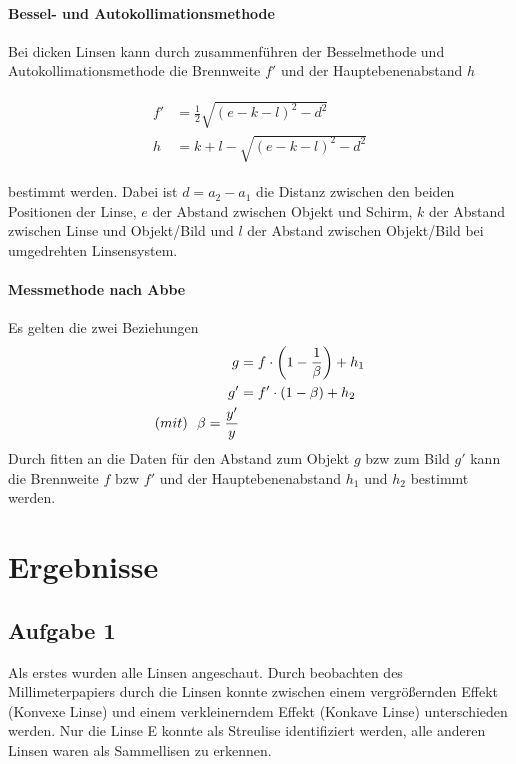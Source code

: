 \documentclass[11pt, a4paper]{article}
\begin{document}
    \paragraph*{Bessel- und Autokollimationsmethode}
    Bei dicken Linsen kann durch zusammenführen der Besselmethode und Autokollimationsmethode die Brennweite $f'$ und der Hauptebenenabstand $h$
    
    \begin{align} \begin{split} \label{eq:dicke}
        f' &= \frac{1}{2} \sqrt{(e-k-l)^2 - d^2} \\
        h &= k + l - \sqrt{(e-k-l)^2 - d^2} \end{split}
    \end{align}
        
    bestimmt werden. Dabei ist $d = a_2 - a_1$ die Distanz zwischen den beiden Positionen der Linse, $e$ der Abstand zwischen Objekt und Schirm, $k$ der Abstand zwischen Linse und Objekt/Bild und $l$ der Abstand zwischen Objekt/Bild bei umgedrehten Linsensystem.

    \paragraph{Messmethode nach Abbe}
    Es gelten die zwei Beziehungen
    \begin{align}
        g &= f \cdot \left(1 - \frac{1}{\beta}\right) + h_1 \label{eq:dicke1} \\
        g' &= f' \cdot (1 - \beta) + h_2 \label{eq:dicke2} \\
        \text(mit) \ \ \beta = \frac{y'}{y}
    \end{align}
    Durch fitten an die Daten für den Abstand zum Objekt $g$ bzw zum Bild $g'$ kann die Brennweite $f$ bzw $f'$ und der Hauptebenenabstand $h_1$ und $h_2$ bestimmt werden.


    \section{Ergebnisse}
    \subsection{Aufgabe 1}
    Als erstes wurden alle Linsen angeschaut. Durch beobachten des Millimeterpapiers durch die Linsen konnte zwischen einem vergrößernden Effekt (Konvexe Linse) und einem verkleinerndem Effekt (Konkave Linse) unterschieden werden. Nur die Linse E konnte als Streulise identifiziert werden, alle anderen Linsen waren als Sammellisen zu erkennen.
\end{document}
